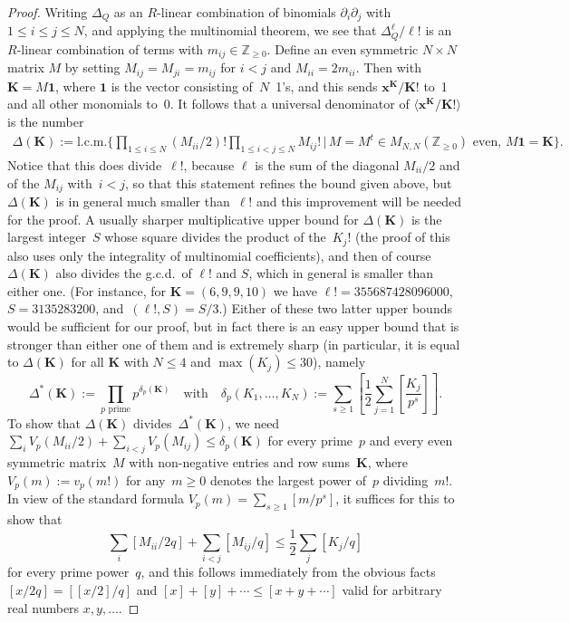 \documentclass[11pt]{article}
\numberwithin{equation}{section}
\numberwithin{equation}{section}
\def\D{\Delta}
\def\pt{\partial}
\def\Z{\mathbb Z}
\newcommand{\mb}{\mathbf}
\def\bK{\mathbf K}
\def\bx{\mathbf x}
\begin{document}
\begin{proof}
Writing $\D_Q$ as an $R$-linear combination of binomials $\pt_i\pt_j$ with
$1\le i\le j\le N$, and applying the multinomial theorem, we see that
$\D_Q^\ell/\ell!$ is an $R$-linear combination of terms
\smash{$\prod_{i\le j}(\pt_i\pt_j)^{m_{ij}}/m_{ij}!$} with $m_{ij}\in\Z_{\ge0}$. Define an even
symmetric $N\times N$ matrix $M$ by setting $M_{ij}=M_{ji}=m_{ij}$ for $i<j$ and
$M_{ii}=2 m_{ii}$. Then \smash{$\prod_{i\le j}(\pt_i\pt_j)^{m_{ij}}=\prod_j\pt_j^{K_j}$}
with $\bK=M\mb1$, where $\mb1$ is the vector consisting of~$N$~1's, and this
sends $\bx^\bK/\bK!$ to~1 and all other monomials to~0.
It follows that a universal denominator of $\big\langle\bx^\bK/\bK! \big\rangle$ is
the number
\begin{align*}
\D(\bK) := \text{l.c.m.}\Biggl\{ \prod_{1\le i\le N}(M_{ii}/2)!\prod_{1\le i<j\le N}M_{ij}!
 \,\Big|\, \text{$M=M^t\in M_{N,N}(\Z_{\ge0})$ even, $M\mb1=\bK$}\Biggr\} .
\end{align*}
Notice that this does divide~$\ell!$, because $\ell$ is the sum of the diagonal
$M_{ii}/2$ and of the $M_{ij}$ with~${i<j}$, so that this statement refines the bound
given above, but $\D(\bK)$ is in general much smaller than~$\ell!$ and this
improvement will be needed for the proof. A usually sharper multiplicative upper
bound for $\D(\bK)$ is the largest integer~$S$ whose square divides the product of
the~$K_j!$ (the proof of this also uses only the integrality of multinomial
coefficients), and then of course~$\D(\bK)$ also divides the g.c.d.\ of $\ell!$ and
$S$, which in general is smaller than either one. (For instance, for $\bK=(6,9,9,10)$
we have $\ell!=355687428096000$, $S=3135283200$, and~${(\ell!,S)=S/3}$.)
Either of these two latter upper bounds would be sufficient for our proof, but in
fact there is an easy upper bound that is stronger than either one of them and is
extremely sharp (in particular, it
is equal to $\D(\bK)$ for all $\bK$ with $N\le4$ and $\max(K_j)\le 30$), namely
\[
\D^*(\bK) := \prod_{\text{$p$ prime}} p^{\delta_p(\bK)} \quad \text{with} \quad
\delta_p(K_1,\dots,K_N) := \sum_{s\ge1}
\left[\frac12\sum_{j=1}^N\left[\frac{K_j}{p^s}\right]\right] .
\]
To show that $\D(\bK)$ divides~$\D^*(\bK)$, we need
$\sum_iV_p(M_{ii}/2)+\sum_{i<j}V_p(M_{ij})\le\delta_p(\bK)$ for every prime~$p$ and
every even symmetric matrix~$M$ with non-negative entries and row sums~$\bK$, where~${V_p(m):=v_p(m!)}$ for any~$m\ge0$ denotes the largest power of~$p$ dividing~$m!$.
In view of the standard formula $V_p(m)=\sum_{s\ge1}[m/p^s]$, it suffices for this
to show that
\[\sum_i[M_{ii}/2q]+\sum_{i<j}[M_{ij}/q]\le\frac12\sum_j[K_j/q]\]
for every prime power~$q$, and this follows immediately from the obvious facts
$[x/2q]=[[x/2]/q]$ and $[x]+[y]+\cdots \le[x+y+\cdots]$ valid for arbitrary real
numbers $x, y,\dots$.


\end{proof}
\end{document}
